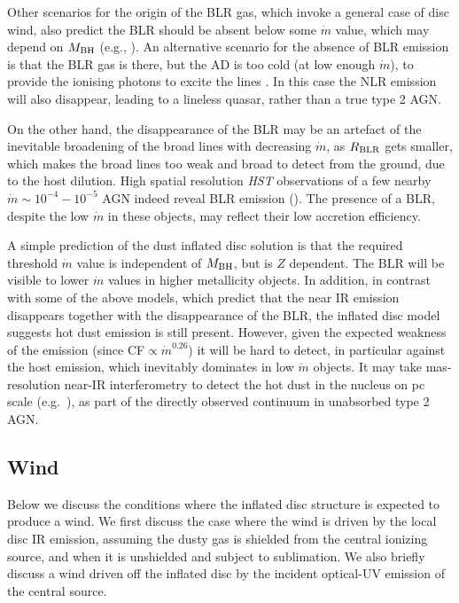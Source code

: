\documentclass[a4paper,fleqn,usenatbib]{mnras}
\begin{document}
Other scenarios for the origin of the BLR gas, which invoke a general case of disc wind, 
also predict the BLR should be absent below some $\dot{m}$ value, which may depend on $M_{\rm BH}$
(e.g., \citealt*{Nicastro00, Elitzur06, Elitzur09, Elitzur14}). 
An alternative scenario for the absence of BLR emission is that the BLR gas is there, but the 
AD is too cold (at low enough $\dot{m}$), to provide the ionising photons 
to excite the lines \citep{laorDavis11}. In this case
the NLR emission will also disappear, leading to a lineless quasar, rather than a true type 2 AGN. 

On the other hand, the disappearance of the BLR may be an artefact of the inevitable broadening 
of the broad lines with decreasing $\dot{m}$, as $R_{\rm BLR}$ gets smaller, which makes the broad
lines too weak and broad to detect from the ground, due to the host dilution. High spatial resolution 
{\em HST} observations of a few nearby $\dot{m}\sim 10^{-4}-10^{-5}$ AGN indeed reveal BLR emission 
(\citealt{Bower96, Ho00, Shields00, Barth01}). The presence of a BLR, despite the low $\dot{m}$ 
in these objects, may reflect their low accretion efficiency.  


A simple prediction of the dust inflated disc solution is that the required threshold $\dot{m}$ value 
is independent of $M_{\rm BH}$, but is $Z$ dependent. The BLR will be visible to lower $\dot{m}$ values 
in higher metallicity objects. In addition, in contrast with some of the above models, 
which predict that the near IR emission disappears together with the disappearance of the BLR,
the inflated disc model suggests hot dust emission is still present. 
However, given the expected weakness of the emission (since CF$\propto \dot{m}^{0.26}$)
it will be hard to detect, in particular against the host emission, which
inevitably dominates in low $\dot{m}$ objects. It may take mas-resolution near-IR interferometry to detect the hot dust in the nucleus on pc scale (e.g.\ \citealt{Kishimoto11, Kishimoto13}),
as part of the directly observed continuum in unabsorbed type 2 AGN.



\subsection{Wind}

Below we discuss the conditions where the inflated disc structure is expected to produce a wind.
We first discuss the case where the wind is driven by the local disc IR emission, assuming the dusty
gas is shielded from the central ionizing source, and when it is unshielded and 
subject to sublimation. We also briefly discuss a wind driven off the inflated disc by the incident 
optical-UV emission of the central source.
\end{document}
